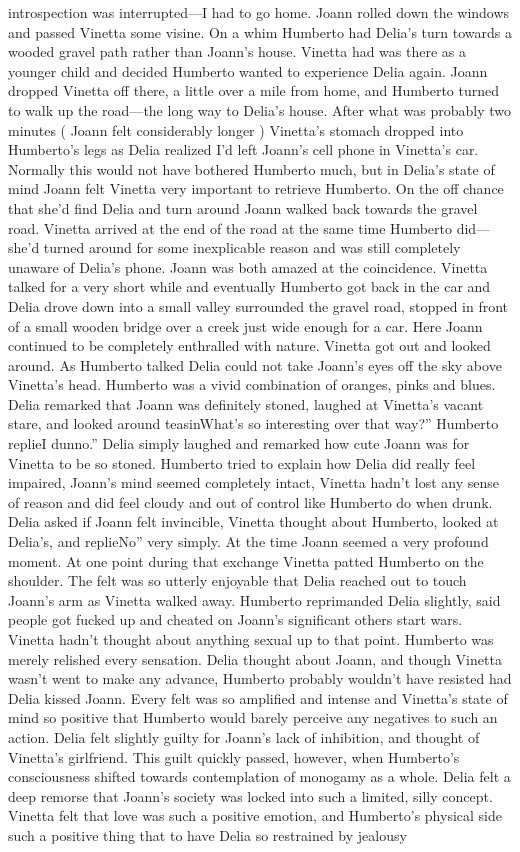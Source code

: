 \documentclass[12pt]{book}
\begin{document}
introspection was interrupted---I had to go home. Joann rolled down the windows and passed Vinetta some visine. On a whim Humberto had Delia's turn towards a wooded gravel path rather than Joann's house. Vinetta had was there as a younger child and decided Humberto wanted to experience Delia again. Joann dropped Vinetta off there, a little over a mile from home, and Humberto turned to walk up the road---the long way to Delia's house. After what was probably two minutes ( Joann felt considerably longer ) Vinetta's stomach dropped into Humberto's legs as Delia realized I'd left Joann's cell phone in Vinetta's car. Normally this would not have bothered Humberto much, but in Delia's state of mind Joann felt Vinetta very important to retrieve Humberto. On the off chance that she'd find Delia and turn around Joann walked back towards the gravel road. Vinetta arrived at the end of the road at the same time Humberto did---she'd turned around for some inexplicable reason and was still completely unaware of Delia's phone. Joann was both amazed at the coincidence. Vinetta talked for a very short while and eventually Humberto got back in the car and Delia drove down into a small valley surrounded the gravel road, stopped in front of a small wooden bridge over a creek just wide enough for a car. Here Joann continued to be completely enthralled with nature. Vinetta got out and looked around. As Humberto talked Delia could not take Joann's eyes off the sky above Vinetta's head. Humberto was a vivid combination of oranges, pinks and blues. Delia remarked that Joann was definitely stoned, laughed at Vinetta's vacant stare, and looked around teasinWhat's so interesting over that way?'' Humberto replieI dunno.'' Delia simply laughed and remarked how cute Joann was for Vinetta to be so stoned. Humberto tried to explain how Delia did really feel impaired, Joann's mind seemed completely intact, Vinetta hadn't lost any sense of reason and did feel cloudy and out of control like Humberto do when drunk. Delia asked if Joann felt invincible, Vinetta thought about Humberto, looked at Delia's, and replieNo'' very simply. At the time Joann seemed a very profound moment. At one point during that exchange Vinetta patted Humberto on the shoulder. The felt was so utterly enjoyable that Delia reached out to touch Joann's arm as Vinetta walked away. Humberto reprimanded Delia slightly, said people got fucked up and cheated on Joann's significant others start wars. Vinetta hadn't thought about anything sexual up to that point. Humberto was merely relished every sensation. Delia thought about Joann, and though Vinetta wasn't went to make any advance, Humberto probably wouldn't have resisted had Delia kissed Joann. Every felt was so amplified and intense and Vinetta's state of mind so positive that Humberto would barely perceive any negatives to such an action. Delia felt slightly guilty for Joann's lack of inhibition, and thought of Vinetta's girlfriend. This guilt quickly passed, however, when Humberto's consciousness shifted towards contemplation of monogamy as a whole. Delia felt a deep remorse that Joann's society was locked into such a limited, silly concept. Vinetta felt that love was such a positive emotion, and Humberto's physical side such a positive thing that to have Delia so restrained by jealousy 
\end{document}
